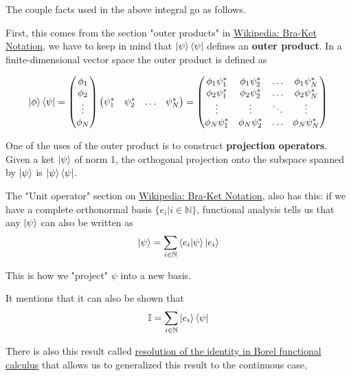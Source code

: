 The couple facts used in the above integral go as follows.

First, this comes from the section "outer products" in
\href{https://en.wikipedia.org/wiki/Bra%E2%80%93ket_notation}{Wikipedia: Bra-Ket Notation},
we have to keep in mind that $\ket{\psi}\bra{\psi}$ defines an \textbf{outer product}.
In a finite-dimensional vector space the outer product is defined as

$$
\ket{\phi}\bra{\psi}
=
\begin{pmatrix}
    \phi_1 \\
    \phi_2 \\
    \vdots \\
    \phi_N 
\end{pmatrix}
\begin{pmatrix}
    \psi_{1}^{*} & \psi_{2}^{*} & \ldots & \psi_{N}^{*}
\end{pmatrix}
=
\begin{pmatrix} 
    \phi_1 \psi_{1}^{*} & \phi_1 \psi_{2}^{*} & \dots  & \phi_1 \psi_{N}^{*} \\
    \phi_2 \psi_{1}^{*} & \phi_2 \psi_{2}^{*} & \dots  & \phi_2 \psi_{N}^{*} \\
    \vdots              & \vdots              & \ddots & \vdots              \\
    \phi_N \psi_{1}^{*} & \phi_N \psi_{2}^{*} & \dots  & \phi_N \psi_{N}^{*} \\
\end{pmatrix}
$$

One of the uses of the outer product is to construct \textbf{projection operators}. Given a ket $\ket{\psi}$
of norm 1, the orthogonal projection onto the subspace spanned by $\ket{\psi}$ is $\ket{\psi}\bra{\psi}$.


The "Unit operator" section on \href{https://en.wikipedia.org/wiki/Bra%E2%80%93ket_notation}{Wikipedia: Bra-Ket Notation},
also has this: if we have a complete orthonormal basis $\{ e_i | i\in\mathbb{N} \}$,
functional analysis tells us that any $\ket{\psi}$ can also be written as
\begin{equation}
\ket{\psi} =
\sum_{i\in\mathbb{N}} \braket{e_i | \psi} \ket{e_i} \label{qm-formalism:discrete-basis}
\end{equation}

This is how we "project" $\psi$ into a new basis.

It mentions that it can also be shown that
$$
\mathbb{I} = \sum_{i\in\mathbb{N}} \ket{e_i} \bra{\psi}
$$

There is also this result called
\href{https://en.wikipedia.org/wiki/Borel_functional_calculus#Resolution_of_the_identity}{resolution of the identity in Borel functional calculus}
that allows us to generalized this result to the continuous case,

